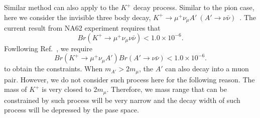 \documentclass[onecolumn, aps, nofootinbib, prd, preprint, floats, floatfix, amsmath, amssymb, superscriptaddress, preprintnumbers]{revtex4-2}
\newcommand{\zb}[1]{{\color{blue} {#1}}}
\begin{document}
\zb{Similar method can also apply to the $K^+$ decay process. Similar to the pion case, here we consider the invisible three body decay, $K^+ \to \mu^+ \nu_\mu A'\ (A' \to \nu\bar\nu)$~\cite{cogollo2025constraints}. The current result from NA62 experiment requires that~\cite{gil2021search} 
\begin{equation}
Br(K^+ \to \mu^+ \nu_\mu \nu\bar\nu) < 1.0 \times 10^{-6}.
\end{equation}
Fowllowing Ref.~\cite{cogollo2025constraints}, we require 
\begin{equation}
Br(K^+ \to \mu^+ \nu_\mu A')Br(A' \to \nu\bar\nu) < 1.0 \times 10^{-6}.
\end{equation}
to obtain the constraints. When $m_{A'} > 2 m_\mu$, the $A'$ can also decay into a muon pair. However, we do not consider such process here for the following reason. The mass of $K^+$ is very closed to $2 m_\mu$. Therefore, we mass range that can be constrained by such process will be very narrow and the decay width of such process will be depressed by the pase space.   

}
\end{document}
